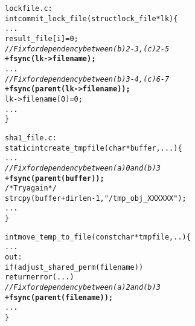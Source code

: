 \begin{figure}[!t]
\vspace{-0.2in}
{\scriptsize 
\begin{alltt}
lockfile.c:
int commit_lock_file(struct lock_file *lk) \{
    ...
    result_file[i] = 0;
\textit{    // Fix for dependency between (b) 2-3, (c) 2-5}
\textbf{+   fsync(lk->filename);} 
    ...
\textit{    // Fix for dependency between (b) 3-4, (c) 6-7}
\textbf{+   fsync(parent(lk->filename));}
    lk->filename[0] = 0;
    ...
\}

sha1_file.c:
static int create_tmpfile(char *buffer, ...) \{
    ...
\textit{    // Fix for dependency between (a) 0 and (b) 3}
\textbf{+   fsync(parent(buffer));} 
    /* Try again */
    strcpy(buffer + dirlen - 1, "/tmp_obj_XXXXXX");
    ...    
\}

int move_temp_to_file(const char *tmpfile, ..) \{
    ...
out:
    if (adjust_shared_perm(filename))
        return error(...)
\textit{    // Fix for dependency between (a) 2 and (b) 3}
\textbf{+   fsync(parent(filename));} 
    ...
\}
\end{alltt}
}
\vspace{-0.2in}
\begin{spacing}{0.90}
\end{spacing}
\vspace{-0.2in}
\end{figure}
